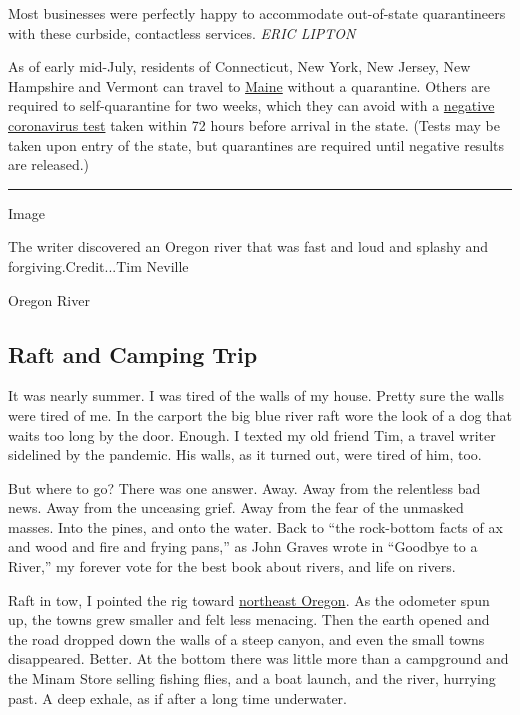 Most businesses were perfectly happy to accommodate out-of-state
quarantineers with these curbside, contactless services. \emph{ERIC
LIPTON}

As of early mid-July, residents of Connecticut, New York, New Jersey,
New Hampshire and Vermont can travel to
\href{https://www.nytimes3xbfgragh.onion/interactive/2020/us/states-reopen-map-coronavirus.html}{Maine}
without a quarantine. Others are required to self-quarantine for two
weeks, which they can avoid with a
\href{https://www.maine.gov/covid19/restartingmaine/keepmainehealthy/faqs}{negative
coronavirus test} taken within 72 hours before arrival in the state.
(Tests may be taken upon entry of the state, but quarantines are
required until negative results are released.)

\begin{center}\rule{0.5\linewidth}{\linethickness}\end{center}

Image

The writer discovered an Oregon river that was fast and loud and splashy
and forgiving.Credit...Tim Neville

Oregon River

\hypertarget{raft-and-camping-trip}{%
\subsection{Raft and Camping Trip}\label{raft-and-camping-trip}}

It was nearly summer. I was tired of the walls of my house. Pretty sure
the walls were tired of me. In the carport the big blue river raft wore
the look of a dog that waits too long by the door. Enough. I texted my
old friend Tim, a travel writer sidelined by the pandemic. His walls, as
it turned out, were tired of him, too.

But where to go? There was one answer. Away. Away from the relentless
bad news. Away from the unceasing grief. Away from the fear of the
unmasked masses. Into the pines, and onto the water. Back to ``the
rock-bottom facts of ax and wood and fire and frying pans,'' as John
Graves wrote in ``Goodbye to a River,'' my forever vote for the best
book about rivers, and life on rivers.

Raft in tow, I pointed the rig toward
\href{http://www.blm.gov/visit/grande-ronde-wild-scenic-river}{northeast
Oregon}. As the odometer spun up, the towns grew smaller and felt less
menacing. Then the earth opened and the road dropped down the walls of a
steep canyon, and even the small towns disappeared. Better. At the
bottom there was little more than a campground and the Minam Store
selling fishing flies, and a boat launch, and the river, hurrying past.
A deep exhale, as if after a long time underwater.

